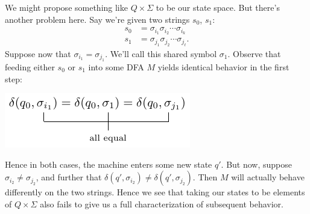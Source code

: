 \documentclass{fkpaper}
\begin{document}
\begin{multicols}{2}
We might propose something like $Q \times \Sigma$ to be our state
space. But there's another problem here. Say we're given two strings
$s_0$, $s_1$:
\begin{align*}
  s_0
  &= \sigma_{i_1} \sigma_{i_2} \cdots \sigma_{i_k} \\
  s_1
  &= \sigma_{j_1} \sigma_{j_2} \cdots \sigma_{j_\ell}.
\end{align*}
Suppose now that $\sigma_{i_1} = \sigma_{j_1}$. We'll call this shared
symbol $\sigma_1$. Observe that feeding either $s_0$ or $s_1$ into
some DFA $M$ yields identical behavior in the first step:
\begin{center}
  \includegraphics{figures/labeled-equation.pdf}
\end{center}
Hence in both cases, the machine enters some new state $q'$. But now,
suppose $\sigma_{i_2} \neq \sigma_{j_2}$, and further that $\delta(q',
\sigma_{i_2}) \neq \delta(q', \sigma_{j_2})$. Then $M$ will actually
behave differently on the two strings. Hence we see that taking our
states to be elements of $Q \times \Sigma$ also fails to give us a
full characterization of subsequent behavior.


\end{multicols}
\end{document}
